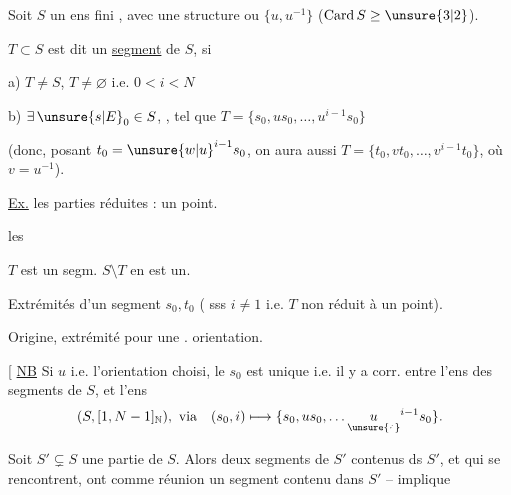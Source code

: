 
\clearpage

Soit $S$ un ens fini , avec une structure  ou  $\{u,u^{-1}\}$ ($\mathrm{Card}\,S\geq\unsure{3|2}$).\unsure{,}

 $T\subset S$  est dit un  \uline{segment} de $S$, si

a)  $T\ne S$, $T\ne\varnothing$  i.e. $0<i<N$

b) $\exists\,\unsure{s|E}_0\in S$, , tel que $T=\{s_0,us_0,\ldots,u^{i-1}s_0\}$

(donc, posant $t_0={\unsure{w|u}}^{i-1}s_0$, on aura aussi $T=\{t_0,vt_0,\ldots,v^{i-1}t_0\}$, où $v=u^{-1}$).

\uline{Ex.} les parties réduites : un point.

les 


$T$ est un segm.  $S\setminus T$ en est un.




Extrémités d'un segment $s_0,t_0$ ( sss $i\ne1$ i.e. $T$ non réduit à un point).

Origine, extrémité pour une . orientation.

[ \uline{NB} Si $u$ i.e. l'orientation choisi, le $s_0$ est unique i.e. il y a corr.  entre l'ens des segments de $S$, et l'ens
\[
 (S,[1,N-1]_{\mathbb N}),\ \text{via}\quad (s_0,i)\longmapsto\{s_0,us_0,\ldots \underset{\unsure{\cdot\!{}^{\cdot}}}{u}^{i-1}s_0\}.
\]

Soit $S'\subsetneq S$ une partie de $S$. Alors  deux segments de $S'$ contenus ds $S'$, et qui se rencontrent, ont comme réunion un segment  contenu dans $S'$ --  implique

\clearpage

